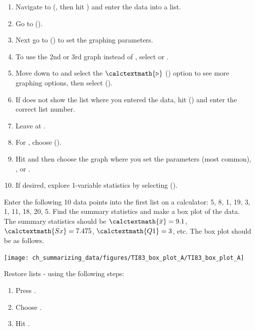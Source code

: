 \begin{termBox}{
\begin{enumerate}
\setlength{\itemsep}{0mm}
\item Navigate to  (, then hit ) and enter the data into a list.
\item Go to  ().
\item Next go to  () to set the graphing parameters.
\item To use the 2nd or 3rd graph instead of , select  or .
\item Move down to  and select the $\calctextmath{\triangleright}$ () option to see more graphing options, then select  ().
\item If  does not show the list where you entered the data, hit  () and enter the correct list number.
\item Leave  at .
\item For , choose  ().
\item Hit  and then choose the graph where you set the parameters  (most common), , or .
\item If desired, explore 1-variable statistics by selecting  ().
\end{enumerate}
}
\end{termBox}

\begin{example}{Enter the following 10 data points into the first list on a calculator: {5, 8, 1, 19, 3, 1, 11, 18, 20, 5}. Find the summary statistics and make a box plot of the data.}
The summary statistics should be $\calctextmath{\bar{x}} = 9.1$, $\calctextmath{Sx} = 7.475$, $\calctextmath{Q1} = 3$, etc. The box plot should be as follows.
\begin{center}
\texttt{[image: ch\_summarizing\_data/figures/TI83\_box\_plot\_A/TI83\_box\_plot\_A]}
\end{center}
\end{example}

\begin{tipBox}{
Restore lists - using the following steps:
\begin{enumerate}
\setlength{\itemsep}{0mm}
\item Press .
\item Choose .
\item Hit .
\end{enumerate}}
\end{tipBox}

